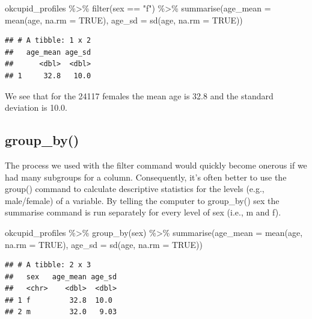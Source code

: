 \documentclass[
]{krantz}
\makeatletter
\newenvironment{Shaded}{\begin{snugshade}}{\end{snugshade}}
\newcommand{\AttributeTok}[1]{\textcolor[rgb]{0.61,0.61,0.61}{#1}}
\newcommand{\ConstantTok}[1]{\textcolor[rgb]{0,0,0}{#1}}
\newcommand{\FunctionTok}[1]{\textcolor[rgb]{0,0,0}{#1}}
\newcommand{\NormalTok}[1]{#1}
\newcommand{\SpecialCharTok}[1]{\textcolor[rgb]{0,0,0}{#1}}
\newcommand{\StringTok}[1]{\textcolor[rgb]{0.5,0.5,0.5}{#1}}
\newenvironment{kframe}{%
\medskip{}
\setlength{\fboxsep}{.8em}
 \def\at@end@of@kframe{}%
 \ifinner\ifhmode%
  \def\at@end@of@kframe{\end{minipage}}%
  \begin{minipage}{\columnwidth}%
 \fi\fi%
 \def\FrameCommand##1{\hskip\@totalleftmargin \hskip-\fboxsep
 \colorbox{shadecolor}{##1}\hskip-\fboxsep
     \hskip-\linewidth \hskip-\@totalleftmargin \hskip\columnwidth}%
 \MakeFramed {\advance\hsize-\width
   \@totalleftmargin\z@ \linewidth\hsize
   \@setminipage}}%
 {\par\unskip\endMakeFramed%
 \at@end@of@kframe}
\renewenvironment{Shaded}{\begin{kframe}}{\end{kframe}}
\makeatother
\begin{document}
\begin{Shaded}
\begin{Highlighting}[]
\NormalTok{okcupid\_profiles }\SpecialCharTok{\%\textgreater{}\%}
  \FunctionTok{filter}\NormalTok{(sex }\SpecialCharTok{==} \StringTok{"f"}\NormalTok{) }\SpecialCharTok{\%\textgreater{}\%}
  \FunctionTok{summarise}\NormalTok{(}\AttributeTok{age\_mean =} \FunctionTok{mean}\NormalTok{(age, }\AttributeTok{na.rm =} \ConstantTok{TRUE}\NormalTok{),}
            \AttributeTok{age\_sd =} \FunctionTok{sd}\NormalTok{(age, }\AttributeTok{na.rm =} \ConstantTok{TRUE}\NormalTok{))}
\end{Highlighting}
\end{Shaded}

\begin{verbatim}
## # A tibble: 1 x 2
##   age_mean age_sd
##      <dbl>  <dbl>
## 1     32.8   10.0
\end{verbatim}

We see that for the 24117 females the mean age is 32.8 and the standard deviation is 10.0.

\hypertarget{group_by}{%
\subsection{group\_by()}\label{group_by}}

The process we used with the filter command would quickly become onerous if we had many subgroups for a column. Consequently, it's often better to use the group() command to calculate descriptive statistics for the levels (e.g., male/female) of a variable. By telling the computer to group\_by() sex the summarise command is run separately for every level of sex (i.e., m and f).

\begin{Shaded}
\begin{Highlighting}[]
\NormalTok{okcupid\_profiles }\SpecialCharTok{\%\textgreater{}\%}
  \FunctionTok{group\_by}\NormalTok{(sex) }\SpecialCharTok{\%\textgreater{}\%}
  \FunctionTok{summarise}\NormalTok{(}\AttributeTok{age\_mean =} \FunctionTok{mean}\NormalTok{(age, }\AttributeTok{na.rm =} \ConstantTok{TRUE}\NormalTok{),}
            \AttributeTok{age\_sd =} \FunctionTok{sd}\NormalTok{(age, }\AttributeTok{na.rm =} \ConstantTok{TRUE}\NormalTok{)) }
\end{Highlighting}
\end{Shaded}

\begin{verbatim}
## # A tibble: 2 x 3
##   sex   age_mean age_sd
##   <chr>    <dbl>  <dbl>
## 1 f         32.8  10.0 
## 2 m         32.0   9.03
\end{verbatim}
\end{document}
